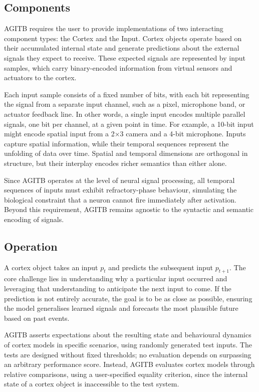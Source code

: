 \documentclass{article}
\begin{document}
	\subsection{Components}
	AGITB requires the user to provide implementations of two interacting component types: the Cortex and the Input. Cortex objects operate based on their accumulated internal state and generate predictions about the external signals they expect to receive. These expected signals are represented by input samples, which carry binary-encoded information from virtual sensors and actuators to the cortex.
	
	Each input sample consists of a fixed number of bits, with each bit representing the signal from a separate input channel, such as a pixel, microphone band, or actuator feedback line. In other words, a single input encodes multiple parallel signals, one bit per channel, at a given point in time. For example, a 10-bit input might encode spatial input from a 2×3 camera and a 4-bit microphone. Inputs capture spatial information, while their temporal sequences represent the unfolding of data over time. Spatial and temporal dimensions are orthogonal in structure, but their interplay encodes richer semantics than either alone. 
	
	Since AGITB operates at the level of neural signal processing, all temporal sequences of inputs must exhibit refractory-phase behaviour, simulating the biological constraint that a neuron cannot fire immediately after activation. Beyond this requirement, AGITB remains agnostic to the syntactic and semantic encoding of signals. 
	
	\subsection{Operation}
	
	A cortex object takes an input $p_t$ and predicts the subsequent input $p_{t+1}$. The core challenge lies in understanding why a particular input occurred and leveraging that understanding to anticipate the next input to come. If the prediction is not entirely accurate, the goal is to be as close as possible, ensuring the model generalises learned signals and forecasts the most plausible future based on past events.
	
	AGITB asserts expectations about the resulting state and behavioural dynamics of cortex models in specific scenarios, using randomly generated test inputs. The tests are designed without fixed thresholds; no evaluation depends on surpassing an arbitrary performance score. Instead, AGITB evaluates cortex models through relative comparisons, using a user-specified equality criterion, since the internal state of a cortex object is inaccessible to the test system.
	
\end{document}
